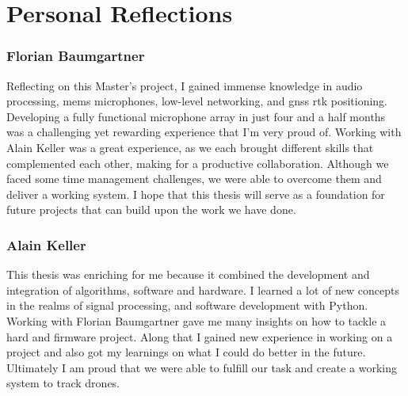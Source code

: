 \section{Personal Reflections}
\subsubsection{Florian Baumgartner}
Reflecting on this Master's project, I gained immense knowledge in audio processing, \acrshort{mems} microphones, low-level networking, and \acrshort{gnss} \acrshort{rtk} positioning.
Developing a fully functional microphone array in just four and a half months was a challenging yet rewarding experience that I'm very proud of.
Working with Alain Keller was a great experience, as we each brought different skills that complemented each other, making for a productive collaboration.
Although we faced some time management challenges, we were able to overcome them and deliver a working system.
I hope that this thesis will serve as a foundation for future projects that can build upon the work we have done.

\subsubsection{Alain Keller}
This thesis was enriching for me because it combined
the development and integration of algorithms, software and hardware.
I learned a lot of new concepts in the realms of signal processing,
and software development with Python.
Working with Florian Baumgartner gave me many insights
on how to tackle a hard and firmware project.
Along that I gained new experience in working
on a project and also got my learnings on what I could do
better in the future.
Ultimately I am proud that we were able to fulfill our task and
create a working system to track drones.
